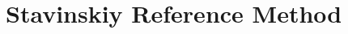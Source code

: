 \documentclass[ALICE,manyauthors]{cernphprep}
\newcommand{\LamK}{$\Lambda$K\xspace}
\begin{document}
\begin{comment}
  $\Lambda$K$^{*0}$ & 0.046 & $\overline{\Lambda}\overline{\mathrm{K}}^{*0}$ & 0.047 & $\Lambda\overline{\mathrm{K}}^{*0}$ & 0.046 & $\overline{\Lambda}$K$^{*0}$ & 0.047 & $\Lambda$K$^{*0}$ & 0.022 & $\overline{\Lambda}$K$^{*0}$ & 0.022 \\
  
  $\Sigma^{0}$K$^{*0}$ & 0.041 & $\overline{\Sigma}^{0}\overline{\mathrm{K}}^{*0}$ & 0.041 & $\Sigma^{0}\overline{\mathrm{K}}^{*0}$ & 0.041 & $\overline{\Sigma}^{0}$K$^{*0}$ & 0.041 & $\Sigma^{0}$K$^{*0}$ & 0.019 & $\overline{\Sigma}^{0}$K$^{*0}$ & 0.019 \\
  
  $\Xi^{0}$K$^{*0}$ & 0.014 & $\overline{\Xi}^{0}\overline{\mathrm{K}}^{*0}$ & 0.013 & $\Xi^{0}\overline{\mathrm{K}}^{*0}$ & 0.014 & $\overline{\Xi}^{0}$K$^{*0}$ & 0.013 & $\Xi^{0}$K$^{*0}$ & 0.007 & $\overline{\Xi}^{0}$K$^{*0}$ & 0.006 \\
  
  $\Xi^{-}$K$^{*0}$ & 0.018 & $\overline{\Xi}^{+}\overline{\mathrm{K}}^{*0}$ & 0.017 & $\Xi^{-}\overline{\mathrm{K}}^{*0}$ & 0.018 & $\overline{\Xi}^{+}$K$^{*0}$ & 0.017 & $\Xi^{-}$K$^{*0}$ & 0.009 & $\overline{\Xi}^{+}$K$^{*0}$ & 0.008 \\
  
  Other & 0.295 & Other & 0.310 & Other & 0.299 & Other & 0.307 & Other & 0.318 & Other & 0.330 \\
  
  Fakes & 0.048 & Fakes & 0.048 & Fakes & 0.048 & Fakes & 0.048 & Fakes & 0.048 & Fakes & 0.048 \\
  
  \hlineB{3.0}
 \end{tabular}}
 \caption{$\lambda$ values for the individual components of the \LamK correlation functions for the case of 3 and 10 residual contributions.}
 \label{tab:LambdaValues_All}
\end{table}

\end{landscape}
\end{comment}


\section{Stavinskiy Reference Method}
\label{App:StavMethod}
\end{document}
